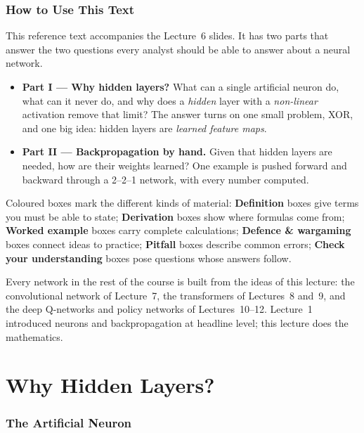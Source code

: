 \documentclass[11pt]{article}
\begin{document}
\tableofcontents
\newpage
\section{How to Use This Text}
This reference text accompanies the Lecture~6 slides. It has two parts that answer the two questions every analyst should be able to answer about a neural network.
\begin{itemize}
\item \textbf{Part I --- Why hidden layers?} What can a single artificial neuron do, what can it never do, and why does a \emph{hidden} layer with a \emph{non-linear} activation remove that limit? The answer turns on one small problem, XOR, and one big idea: hidden layers are \emph{learned feature maps}.
\item \textbf{Part II --- Backpropagation by hand.} Given that hidden layers are needed, how are their weights learned? One example is pushed forward and backward through a 2--2--1 network, with every number computed.
\end{itemize}
Coloured boxes mark the different kinds of material: \textbf{Definition} boxes give terms you must be able to state; \textbf{Derivation} boxes show where formulas come from; \textbf{Worked example} boxes carry complete calculations; \textbf{Defence \& wargaming} boxes connect ideas to practice; \textbf{Pitfall} boxes describe common errors; \textbf{Check your understanding} boxes pose questions whose answers follow.

Every network in the rest of the course is built from the ideas of this lecture: the convolutional network of Lecture~7, the transformers of Lectures~8 and~9, and the deep Q-networks and policy networks of Lectures~10--12. Lecture~1 introduced neurons and backpropagation at headline level; this lecture does the mathematics.

\part{Why Hidden Layers?}

\section{The Artificial Neuron}
\end{document}
